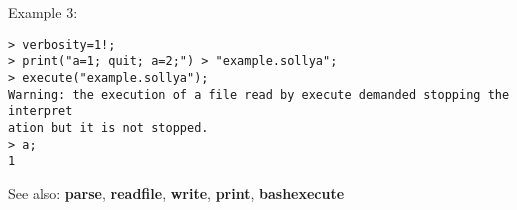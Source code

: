 \noindent Example 3: 
\begin{center}\begin{minipage}{15cm}\begin{Verbatim}[frame=single]
> verbosity=1!;
> print("a=1; quit; a=2;") > "example.sollya";
> execute("example.sollya"); 
Warning: the execution of a file read by execute demanded stopping the interpret
ation but it is not stopped.
> a;
1
\end{Verbatim}
\end{minipage}\end{center}
See also: \textbf{parse}, \textbf{readfile}, \textbf{write}, \textbf{print}, \textbf{bashexecute}
